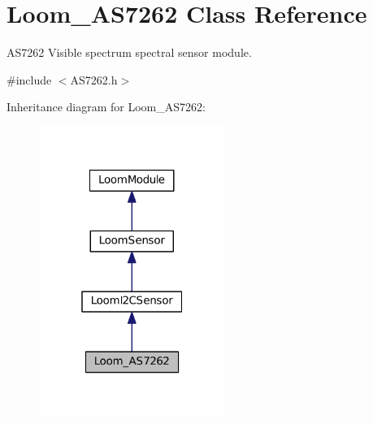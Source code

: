 \hypertarget{class_loom___a_s7262}{}\section{Loom\+\_\+\+A\+S7262 Class Reference}
\label{class_loom___a_s7262}


A\+S7262 Visible spectrum spectral sensor module.  




{\ttfamily \#include $<$A\+S7262.\+h$>$}



Inheritance diagram for Loom\+\_\+\+A\+S7262\+:\nopagebreak
\begin{figure}[H]
\begin{center}
\leavevmode
\includegraphics[width=172pt]{class_loom___a_s7262__inherit__graph}
\end{center}
\end{figure}
